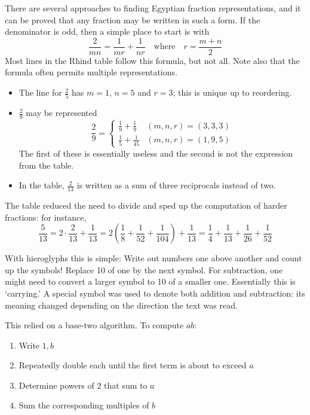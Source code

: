 There are several approaches to finding Egyptian fraction representations, and it can be proved that any fraction may be written in such a form. If the denominator is odd, then a simple place to start is with
\[
	\frac 2{mn}=\frac 1{mr}+\frac 1{nr}\quad\text{where}\quad r=\frac{m+n}2
\]
Most lines in the Rhind table follow this formula, but not all. Note also that the formula often permits multiple representations.
\begin{itemize}
  \item The line for $\frac 25$ has $m=1$, $n=5$ and $r=3$; this is unique up to reordering.
  \item $\frac 29$ may be represented
  \[
  	\frac 29=
  	\begin{cases}
  		\frac 19+\frac 19&(m,n,r)=(3,3,3)\\
  		\frac 15+\frac 1{45}&(m,n,r)=(1,9,5) 	
  	\end{cases}
  \]
  The first of these is essentially useless and the second is not the expression from the table.
  \item In the table, $\frac 2{13}$ is written as a sum of three reciprocals instead of two.
\end{itemize}

The table reduced the need to divide and sped up the computation of harder fractions: for instance,
\[
	\frac 5{13} =2\cdot\frac 2{13}+\frac 1{13} =2\left(\frac 18+\frac 1{52}+\frac 1{104}\right)+\frac 1{13} =\frac 14+\frac 1{13}+\frac 1{26}+\frac 1{52}
\]



 

 With hieroglyphs this is simple: Write out numbers one above another and count up the symbols! Replace 10 of one by the next symbol. For subtraction, one might need to convert a larger symbol to 10 of a smaller one. Essentially this is `carrying.' A special symbol was used to denote both addition and subtraction: its meaning changed depending on the direction the text was read.

 This relied on a base-two algorithm. To compute $ab$:
\begin{enumerate}
  \item Write $1,b$
  \item Repeatedly double each until the first term is about to exceed $a$
  \item Determine powers of 2 that sum to $a$
  \item Sum the corresponding multiples of $b$
\end{enumerate}

